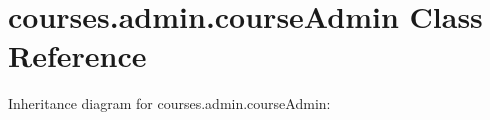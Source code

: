 \hypertarget{classcourses_1_1admin_1_1courseAdmin}{}\section{courses.\+admin.\+course\+Admin Class Reference}
\label{classcourses_1_1admin_1_1courseAdmin}


Inheritance diagram for courses.\+admin.\+course\+Admin\+:

